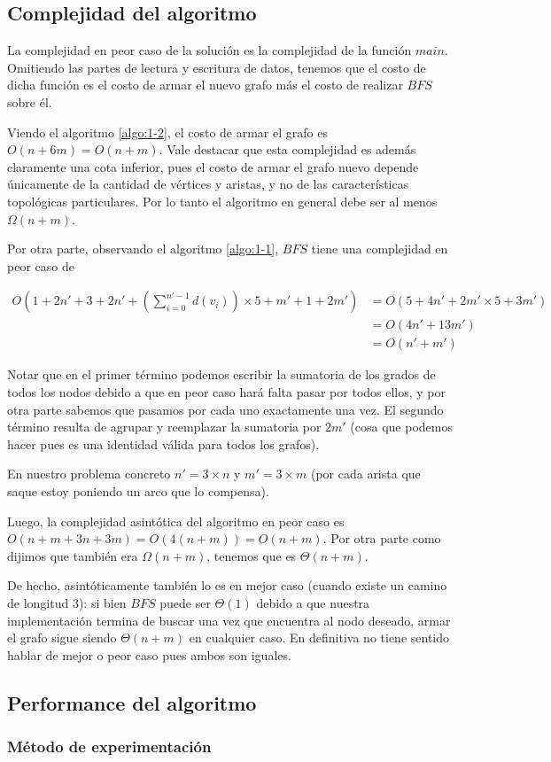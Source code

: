 \subsection{Complejidad del algoritmo}
La complejidad en peor caso de la solución es la complejidad de la función $main$. Omitiendo las partes de lectura y escritura de datos, tenemos que el costo de dicha función es el costo de armar el nuevo grafo más el costo de realizar $BFS$ sobre él.

Viendo el algoritmo \ref{algo:1-2}, el costo de armar el grafo es $O(n+6m) = O(n+m)$. Vale destacar que esta complejidad es además claramente una cota inferior, pues el costo de armar el grafo nuevo depende únicamente de la cantidad de vértices y aristas, y no de las características topológicas particulares. Por lo tanto el algoritmo en general debe ser al menos $\Omega(n+m)$.

Por otra parte, observando el algoritmo \ref{algo:1-1}, $BFS$ tiene una complejidad en peor caso de 

\begin{equation}
\begin{aligned}
	O(1+2n'+3+2n'+(\sum_{i=0}^{n'-1}d(v_{i}))\times 5 + m' + 1 + 2m') & = O(5+4n'+2m'\times 5 + 3m') \\
	&= O(4n'+13m') \\
	&= O(n'+m')
\end{aligned}
\end{equation}

Notar que en el primer término podemos escribir la sumatoria de los grados de todos los nodos debido a que en peor caso hará falta pasar por todos ellos, y por otra parte sabemos que pasamos por cada uno exactamente una vez. El segundo término resulta de agrupar y reemplazar la sumatoria por $2m'$ (cosa que podemos hacer pues es una identidad válida para todos los grafos).

En nuestro problema concreto $n'=3\times n$ y $m' = 3\times m$ (por cada arista que saque estoy poniendo un arco que lo compensa).

Luego, la complejidad asintótica del algoritmo en peor caso es $O(n+m+3n+3m) = O(4(n+m)) = O(n+m)$. Por otra parte como dijimos que también era $\Omega(n+m)$, tenemos que es $\Theta(n+m)$.

De hecho, asintóticamente también lo es en mejor caso (cuando existe un camino de longitud 3): si bien $BFS$ puede ser $\Theta(1)$ debido a que nuestra implementación termina de buscar una vez que encuentra al nodo deseado, armar el grafo sigue siendo $\Theta(n+m)$ en cualquier caso. En definitiva no tiene sentido hablar de mejor o peor caso pues ambos son iguales.

\subsection{Performance del algoritmo}

\subsubsection{M\'etodo de experimentación}